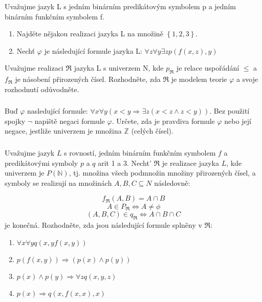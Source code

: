 \subsubsection{}
Uvažujme jazyk L s jedním binárním predikátovým symbolem p a jedním binárním
funkčním symbolem f.

\begin{enumerate}
  \item Najděte nějakou realizaci jazyka L na množině $\left \{ 1,2,3 \right
  \}$.
  \item Nechť $\varphi$ je následující formule jazyka L: $\forall z \forall y
  \exists z p(f(x,z),y)$
\end{enumerate}

Uvažujme realizaci $\Re$ jazyka L s univerzem N, kde $p_{\Re}$ je relace
uspořádání $\leq$ a $f_{\Re}$ je násobení přirozených čísel. Rozhodněte, zda
$\Re$ je modelem teorie $\varphi$ a svoje rozhodnutí odůvodněte.
\subsubsection{}
Buď $\varphi$ nasledující formule: $\forall x \forall y (x < y \Rightarrow
\exists z (x<z\wedge z<y))$. Bez použití
spojky $\neg$ napiště negaci formule $\varphi$. Určete, zda je pravdiva formule
$\varphi$ nebo její
negace, jestliže univerzem je množina $\mathbb{Z}$ (celých čísel).
\subsubsection{}
Uvažujme jazyk $L$ s rovností, jedním binárním funkčním symbolem $f$ a
predikátovými symboly $p$ a $q$ arit 1 a 3. Necht' $\Re$ je realizace jazyka $L$, 
kde univerzem je $P(\mathbb{N})$, tj. množina všech podmnožin množiny přirozených čísel, a symboly se realizují
na množinách $A, B, C \subseteq  N$ následovně:

$$f_{\Re }(A,B)=A\cap B$$
$$A \in P_{\Re} \Leftrightarrow A \neq \phi $$
$$(A,B,C) \in q_{\Re} \Leftrightarrow A \cap B \cap C$$ je konečná.
Rozhodněte, zda jsou následující formule splněny v $\Re$:
\begin{enumerate}[1)]
  \item $\forall x \forall y q(x,yf(x,y))$
  \item $p(f(x,y)) \Rightarrow (p(x) \wedge p(y))$
  \item $p(x) \wedge p(y) \Rightarrow \forall z q(x,y,z)$
  \item $p(x) \Rightarrow q(x, f(x,x), x)$
\end{enumerate}
